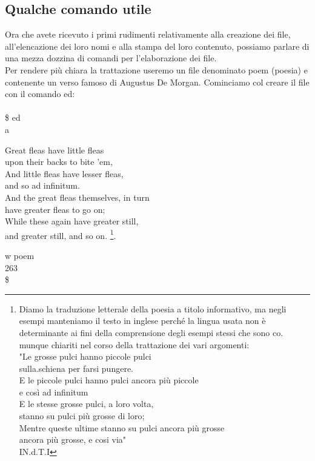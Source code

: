 \subsection{Qualche comando utile}
Ora che avete ricevuto i primi rudimenti relativamente alla creazione dei file, all'elencazione 
dei loro nomi e alla stampa del loro contenuto, possiamo parlare di una mezza dozzina 
di comandi per l'elaborazione dei file.\\
Per rendere più chiara la trattazione useremo un file denominato poem (poesia) e contenente
un verso famoso di Augustus De Morgan.
Cominciamo col creare il file con il comando ed:\\\\
\$ ed\\
a
\begin{center}
	Great fleas have little fleas\\
	upon their backs to bite 'em,\\
	And little fleas have lesser fleas,\\
	and so ad infinitum.\\
	And the great fleas themselves, in turn\\
	have greater fleas to go on;\\
	While these again have greater still,\\
	and greater still, and so on. \footnote{Diamo la traduzione letterale della poesia a titolo informativo, ma negli esempi manteniamo il testo in
		inglese perché la lingua usata non è determinante ai fini della comprensione degli esempi stessi che sono co.
		munque chiariti nel corso della trattazione dei vari argomenti:\\
		"Le grosse pulci hanno piccole pulci\\
		sulla.schiena per farsi pungere.\\
		E le piccole pulci hanno pulci ancora più piccole\\
		e così ad infinitum\\
		E le stesse grosse pulci, a loro volta,\\
		stanno su pulci più grosse di loro;\\
		Mentre queste ultime stanno su pulci ancora più grosse\\
		ancora più grosse, e cosi via"\\
		IN.d.T.I}.\\
\end{center}
w poem\\
263\\
\$\\

